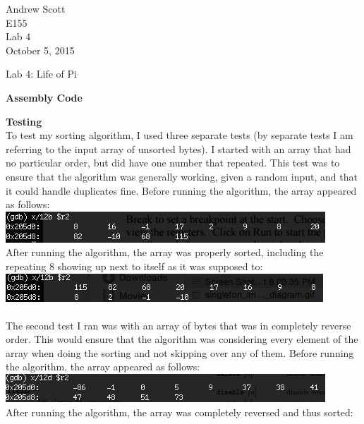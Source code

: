 \documentclass[11pt,letterpaper]{article}
\newcommand{\header}{\noindent\textbf}
\begin{document}
\begin{flushright}
Andrew Scott\\
E155\\
Lab 4\\
October 5, 2015
\end{flushright}

\begin{center}
Lab 4: Life of Pi
\end{center}

\header{Assembly Code}\\


\pagebreak

\header{Testing}\\
To test my sorting algorithm, I used three separate tests (by separate tests I am referring to the input array of unsorted bytes). I started with an array that had no particular order, but did have one number that repeated. This test was to ensure that the algorithm was generally working, given a random input, and that it could handle duplicates fine. Before running the algorithm, the array appeared as follows:\\
\includegraphics[scale=1.0]{test1Before}\\
After running the algorithm, the array was properly sorted, including the repeating 8 showing up next to itself as it was supposed to:\\
\includegraphics[scale=1.0]{test1After}\\\\
The second test I ran was with an array of bytes that was in completely reverse order. This would ensure that the algorithm was considering every element of the array when doing the sorting and not skipping over any of them. Before running the algorithm, the array appeared as follows:\\
\includegraphics[scale=1.0]{test2Before}\\
After running the algorithm, the array was completely reversed and thus sorted:\\
\end{document}
